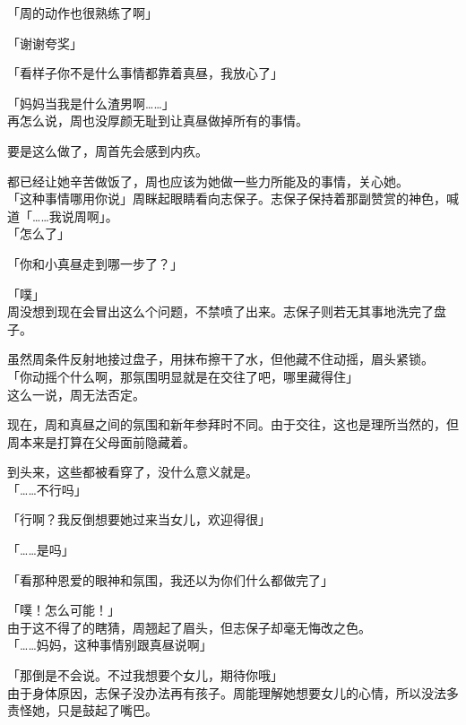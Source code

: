 「周的动作也很熟练了啊」

「谢谢夸奖」

「看样子你不是什么事情都靠着真昼，我放心了」

「妈妈当我是什么渣男啊……」\\

再怎么说，周也没厚颜无耻到让真昼做掉所有的事情。

要是这么做了，周首先会感到内疚。

都已经让她辛苦做饭了，周也应该为她做一些力所能及的事情，关心她。\\

「这种事情哪用你说」周眯起眼睛看向志保子。志保子保持着那副赞赏的神色，喊道「……我说周啊」。\\

「怎么了」

「你和小真昼走到哪一步了？」

「噗」\\

周没想到现在会冒出这么个问题，不禁喷了出来。志保子则若无其事地洗完了盘子。

虽然周条件反射地接过盘子，用抹布擦干了水，但他藏不住动摇，眉头紧锁。\\

「你动摇个什么啊，那氛围明显就是在交往了吧，哪里藏得住」\\

这么一说，周无法否定。

现在，周和真昼之间的氛围和新年参拜时不同。由于交往，这也是理所当然的，但周本来是打算在父母面前隐藏着。

到头来，这些都被看穿了，没什么意义就是。\\

「……不行吗」

「行啊？我反倒想要她过来当女儿，欢迎得很」

「……是吗」

「看那种恩爱的眼神和氛围，我还以为你们什么都做完了」

「噗！怎么可能！」\\

由于这不得了的瞎猜，周翘起了眉头，但志保子却毫无悔改之色。\\

「……妈妈，这种事情别跟真昼说啊」

「那倒是不会说。不过我想要个女儿，期待你哦」\\

由于身体原因，志保子没办法再有孩子。周能理解她想要女儿的心情，所以没法多责怪她，只是鼓起了嘴巴。\\

